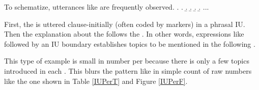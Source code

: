 To schematize,
utterances like \Next are frequently observed.
%
\ex.
 \a.  \tp{\dvline}
 \b.  \tp{\dvline}
 \b.  \tp{\dvline}
 \b.  \tp{\dvline}
 \b. ...

First, the  is uttered clause-initially (often coded by  markers) in a phrasal IU.
Then the explanation about the  follows the .
In other words, expressions like \Last[a] followed by an IU boundary establishes topics to be mentioned in the following .

This type of example is small in number per  because there is only a few topics introduced in each .
This blurs the pattern like \Last in simple count of raw numbers like the one shown in Table \ref{IUPerT} and Figure \ref{IUPerF}.
%
%
